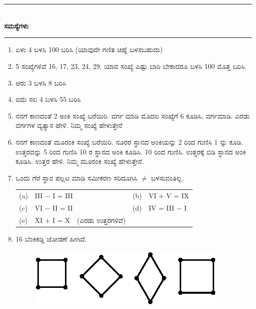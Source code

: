 \chapter[ಅಧ್ಯಾಯ 5]{}\label{chap5}

\begin{center}
\rule{5cm}{1pt}\\[5pt]
{\Large\bfseries ಸಮಸ್ಯೆಗಳು}\\[3pt]
\rule{5cm}{1pt}
\end{center}

\begin{enumerate}
\renewcommand{\labelenumi}{\bf\theenumi.}
\itemsep=5pt

\item ಏಳು 4 ಬಳಸಿ 100 ಬರಿಸಿ (ಯಾವುದೇ ಗಣಿತ ಚಿಹ್ನೆ ಬಳಸಬಹುದು)

\item 5 ಸಂಖ್ಯೆಗಳಿವೆ 16, 17, 23, 24, 29. ಯಾವ ಸಂಖ್ಯೆ ಎಷ್ಟು ಬಾರಿ ಬೇಕಾದರೂ ಬಳಸಿ 100 ಮೊತ್ತ ಬರಿಸಿ.  

\item ಆರು 3 ಬಳಸಿ 8 ಬರಿಸಿ

\item ಐದು ಸಲ 4 ಬಳಸಿ 55 ಬರಿಸಿ 

\item ನನಗೆ ಕಾಣದಂತೆ 2 ಅಂಕಿ ಸಂಖ್ಯೆ ಬರೆಯಿರಿ. ವರ್ಗ ಮಾಡಿ ಮೊದಲ ಸಂಖ್ಯೆಗೆ 6 ಕೂಡಿಸಿ, ವರ್ಗಮಾಡಿ. ಎರಡು ವರ್ಗಗಳ ವ್ಯತ್ಯಾಸ ಹೇಳಿ. ನಿಮ್ಮ ಸಂಖ್ಯೆ ಹೇಳುತ್ತೇನೆ

\item ನನಗೆ ಕಾಣದಂತೆ ಮೂರಂಕಿ ಸಂಖ್ಯೆ ಬರೆಯಿರಿ. ನೂರರ ಸ್ಥಾನದ ಅಂಕಿಯನ್ನು 2 ರಿಂದ ಗುಣಿಸಿ 1 ನ್ನು ಕೂಡಿ. ಉತ್ತರವನ್ನು 5 ರಿಂದ ಗುಣಿಸಿ 10 ರ ಸ್ಥಾನದ ಅಂಕಿ ಕೂಡಿಸಿ. 10 ರಿಂದ ಗುಣಿಸಿ. ಉತ್ತರಕ್ಕೆ ಬಿಡಿ ಸ್ಥಾನದ ಅಂಕಿ ಕೂಡಿಸಿ. ಉತ್ತರ ಹೇಳಿ. ನಿಮ್ಮ ಮೂರಂಕಿ ಸಂಖ್ಯೆ ಹೇಳುತ್ತೇನೆ.

\item ಒಂದು ಗೆರೆ ಸ್ಥಾನ ಪಲ್ಲಟ ಮಾಡಿ ಸಮೀಕರಣ ಸರಿದೂಗಿಸಿ $\neq$ ಬಳಸುವಂತಿಲ್ಲ.

\begin{tabular}{llll}
(a)& III $-$ I = III &(b) & VI $+$ V = IX\\
(c)& VI $-$ II = II &(d) & IV = III $-$ I\\
(e)& XI $+$ I = X~~(ಎರಡು ಉತ್ತರಗಳಿವೆ) & &
\end{tabular}

\eject

\item 16 ಬೆಂಕಿಕಡ್ಡಿ ಜೋಡಣೆ ಹೀಗಿದೆ.
\begin{figure}[H]
\centering
\includegraphics[scale=.9]{images/chap5/q8.eps}
\end{figure} 


\end{enumerate}

